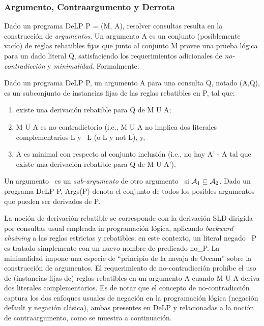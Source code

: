 \subsubsection{Argumento, Contraargumento y Derrota}

Dado un programa DeLP P = (M, A), resolver consultas resulta en la construcción de \textit{argumentos}.
Un argumento A es un conjunto (posiblemente vacío) de reglas rebatibles fijas que junto al conjunto M
provee una prueba lógica para un dado literal Q, satisfaciendo los requerimientos adicionales de 
\textit{no-contradicción} y \textit{minimalidad}. Formalmente:

\begin{definicion}[Argumento]
	Dado un programa DeLP P, un argumento A para una consulta Q, notado (A,Q), es un subconjunto de 
	instancias fijas de las reglas rebatibles en P, tal que:
	
	\begin{enumerate}[(1)]
		\item existe una derivación rebatible para Q de M U A;
		\item M U A es no-contradictorio (i.e., M U A no implica dos literales complementarios L y ~L
		(o L y not L), y,		
		\item A es minimal con respecto al conjunto inclusión (i.e., no hay A' - A tal que existe una 
		derivación rebatible para Q de M U A').
	\end{enumerate}
	
\end{definicion}

Un argumento \AaQa\ es un \textit{sub-argumento} de otro argumento \AbQb\ si $\mbox{${\mathcal A_1}$} \subseteq \mbox{${\mathcal A_2}$}$.
Dado un programa DeLP P, Args(P) denota el conjunto de todos los posibles argumentos que pueden ser 
derivados de P.

La noción de derivación rebatible  se corresponde con la derivación SLD dirigida por consultas usual
empleada in programación lógica, aplicando \textit{backward chaining} a las reglas estrictas y rebatibles;
en este contexto, un literal negado ~P es tratado simplemente con un nuevo nombre de predicado no\_P. La 
minimalidad impone una especie de ``principio de la navaja de Occam'' sobre la construcción de argumentos.
El requerimiento de no-contradicción prohíbe el uso de (instancias fijas de) reglas rebatibles en un 
argumento A cuando M U A deriva dos literales complementarios. Es de notar que el concepto de no-contradicción
captura los dos enfoques usuales de negación en la programación lógica (negación default y negación clásica),
ambas presentes en DeLP y relacionadas a la noción de contraargumento, como se muestra a continuación.

